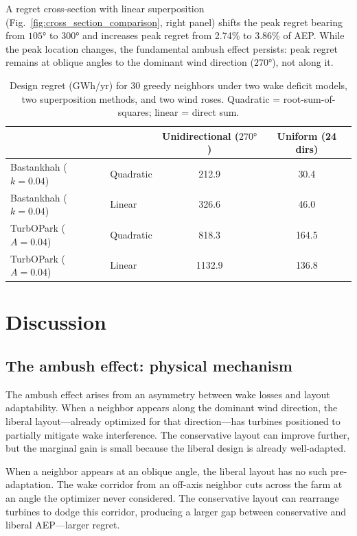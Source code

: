 \documentclass[manuscript, 12pt]{copernicus}
\begin{document}
A regret cross-section with linear superposition (Fig.~\ref{fig:cross_section_comparison}, right panel) shifts the peak regret bearing from $105°$ to $300°$ and increases peak regret from 2.74\% to 3.86\% of AEP.
While the peak location changes, the fundamental ambush effect persists: peak regret remains at oblique angles to the dominant wind direction ($270°$), not along it.

\begin{table}
    \centering
    \caption{Design regret (GWh/yr) for 30 greedy neighbors under two wake deficit models, two superposition methods, and two wind roses. Quadratic = root-sum-of-squares; linear = direct sum.}
    \label{tab:wake_model}
    \begin{tabular}{llcc}
        \toprule
        & & Unidirectional ($270°$) & Uniform (24 dirs) \\
        \midrule
        Bastankhah ($k = 0.04$) & Quadratic & 212.9 & 30.4 \\
        Bastankhah ($k = 0.04$) & Linear & 326.6 & 46.0 \\
        TurbOPark ($A = 0.04$) & Quadratic & 818.3 & 164.5 \\
        TurbOPark ($A = 0.04$) & Linear & 1132.9 & 136.8 \\
        \bottomrule
    \end{tabular}
\end{table}

\section{Discussion}\label{sec:discussion}

\subsection{The ambush effect: physical mechanism}

The ambush effect arises from an asymmetry between wake losses and layout adaptability.
When a neighbor appears along the dominant wind direction, the liberal layout---already optimized for that direction---has turbines positioned to partially mitigate wake interference.
The conservative layout can improve further, but the marginal gain is small because the liberal design is already well-adapted.

When a neighbor appears at an oblique angle, the liberal layout has no such pre-adaptation.
The wake corridor from an off-axis neighbor cuts across the farm at an angle the optimizer never considered.
The conservative layout can rearrange turbines to dodge this corridor, producing a larger gap between conservative and liberal AEP---larger regret.
\end{document}
